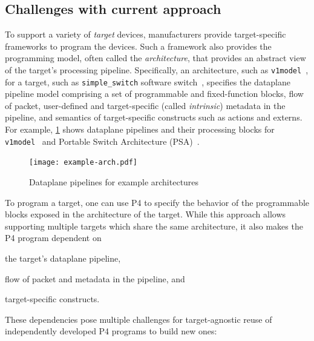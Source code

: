 \documentclass[letterpaper,twocolumn,10pt]{article}
\begin{document}
\subsection{Challenges with current approach}
\label{sec:challenges}

 To support a variety of
\emph{target} devices, manufacturers provide target-specific
frameworks to program the devices. Such a framework also provides the
programming model, often called the \emph{architecture}, that provides
an abstract view of the target's processing pipeline. Specifically, an
architecture, such as \texttt{v1model}~\cite{v1model.p4}, for a
target, such as \texttt{simple\_switch} software
switch~\cite{simple_switch.md}, specifies the dataplane pipeline model
comprising a set of programmable and fixed-function blocks, flow of
packet, user-defined and target-specific (called \emph{intrinsic})
metadata in the pipeline, and semantics of target-specific constructs
such as actions and externs. For example, \cref{fig:arch-example}
shows dataplane pipelines and their processing blocks for
\texttt{v1model}~\cite{v1model.p4} and Portable Switch
Architecture (PSA)~\cite{psa}.
\begin{figure}[tb]
  \centering
  \texttt{[image: example-arch.pdf]}
  \caption{Dataplane pipelines for example architectures}
  \label{fig:arch-example}
\end{figure}

To program a target, one can use P4 to specify the behavior of the
programmable blocks exposed in the architecture of the target. While
this approach allows supporting multiple targets which share the same
architecture, it also makes the P4 program dependent on
\begin{enumerate*}[label=(\roman*)]
  \item the target's dataplane pipeline,
  \item flow of packet and metadata in the pipeline, and
  \item target-specific constructs.
\end{enumerate*}
These dependencies pose multiple challenges for target-agnostic reuse
of independently developed P4 programs to build new ones:
\end{document}
